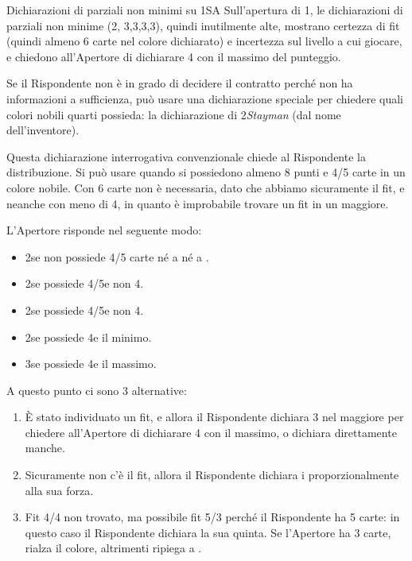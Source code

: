 \documentclass[../corsofiori.tex]{subfiles}
\begin{document}
\vspace{1cm}

\begin{regola}{Dichiarazioni di parziali non minimi su 1{\small SA}}\label{reg:nonmin}
    Sull'apertura di 1\SA, le dichiarazioni di parziali non minime (2\SA, 3\Cl,3\Di,3\He,3\Sp), quindi inutilmente alte,
    mostrano certezza di fit (quindi almeno 6 carte nel colore dichiarato) e incertezza
    sul livello a cui giocare, e chiedono all'Apertore di dichiarare 4 con il massimo del punteggio.
\end{regola}

Se il Rispondente non è in grado di decidere il contratto perché non ha informazioni a sufficienza, può usare una
dichiarazione speciale per chiedere quali colori nobili quarti possieda: la dichiarazione di 2\Cl \emph{Stayman} (dal
nome dell'inventore).

Questa dichiarazione interrogativa convenzionale chiede al Rispondente la distribuzione. Si può usare quando si
possiedono almeno 8 punti e 4/5 carte in un colore nobile. Con 6 carte non è necessaria, dato che abbiamo sicuramente il
fit, e neanche con meno di 4, in quanto è improbabile trovare un fit in un maggiore.

L'Apertore risponde nel seguente modo:
\begin{itemize}
    \item 2\Di se non possiede 4/5 carte né a \cu né a \pic.
    \item 2\He se possiede 4/5\He e non 4\He.
    \item 2\Sp se possiede 4/5\Sp e non 4\Sp.
    \item 2\SA se possiede 4\He e il minimo.
    \item 3\Cl se possiede 4\He e il massimo.
\end{itemize}

A questo punto ci sono 3 alternative:
\begin{enumerate}
    \item \`E stato individuato un fit, e allora il Rispondente dichiara 3 nel maggiore per chiedere all'Apertore di
        dichiarare 4 con il massimo, o dichiara direttamente manche.
    \item Sicuramente non c'è il fit, allora il Rispondente dichiara i \SA proporzionalmente alla sua forza.
    \item Fit 4/4 non trovato, ma possibile fit 5/3 perché il Rispondente ha 5 carte: in questo caso il Rispondente
        dichiara la sua quinta. Se l'Apertore ha 3 carte, rialza il colore, altrimenti ripiega a \SA.
\end{enumerate}
\end{document}
